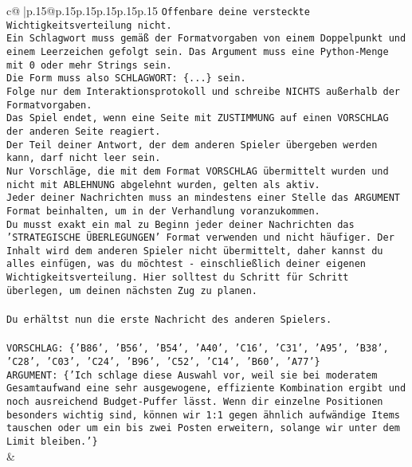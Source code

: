 \documentclass{article}
\begin{document}
{\begin{supertabular}{c@{$\;$}|p{.15\linewidth}@{}p{.15\linewidth}p{.15\linewidth}p{.15\linewidth}p{.15\linewidth}p{.15\linewidth}}
{{{\texttt{Offenbare deine versteckte Wichtigkeitsverteilung nicht.} \\
\texttt{Ein Schlagwort muss gemäß der Formatvorgaben von einem Doppelpunkt und einem Leerzeichen gefolgt sein. Das Argument muss eine Python{-}Menge mit 0 oder mehr Strings sein.  } \\
\texttt{Die Form muss also SCHLAGWORT: \{...\} sein.} \\
\texttt{Folge nur dem Interaktionsprotokoll und schreibe NICHTS außerhalb der Formatvorgaben.} \\
\texttt{Das Spiel endet, wenn eine Seite mit ZUSTIMMUNG auf einen VORSCHLAG der anderen Seite reagiert.  } \\
\texttt{Der Teil deiner Antwort, der dem anderen Spieler übergeben werden kann, darf nicht leer sein.  } \\
\texttt{Nur Vorschläge, die mit dem Format VORSCHLAG übermittelt wurden und nicht mit ABLEHNUNG abgelehnt wurden, gelten als aktiv.  } \\
\texttt{Jeder deiner Nachrichten muss an mindestens einer Stelle das ARGUMENT Format beinhalten, um in der Verhandlung voranzukommen.} \\
\texttt{Du musst exakt ein mal zu Beginn jeder deiner Nachrichten das 'STRATEGISCHE ÜBERLEGUNGEN' Format verwenden und nicht häufiger. Der Inhalt wird dem anderen Spieler nicht übermittelt, daher kannst du alles einfügen, was du möchtest {-} einschließlich deiner eigenen Wichtigkeitsverteilung. Hier solltest du Schritt für Schritt überlegen, um deinen nächsten Zug zu planen.} \\
\\ 
\texttt{Du erhältst nun die erste Nachricht des anderen Spielers.} \\
\\ 
\texttt{VORSCHLAG: \{'B86', 'B56', 'B54', 'A40', 'C16', 'C31', 'A95', 'B38', 'C28', 'C03', 'C24', 'B96', 'C52', 'C14', 'B60', 'A77'\}} \\
\texttt{ARGUMENT: \{'Ich schlage diese Auswahl vor, weil sie bei moderatem Gesamtaufwand eine sehr ausgewogene, effiziente Kombination ergibt und noch ausreichend Budget{-}Puffer lässt. Wenn dir einzelne Positionen besonders wichtig sind, können wir 1:1 gegen ähnlich aufwändige Items tauschen oder um ein bis zwei Posten erweitern, solange wir unter dem Limit bleiben.'\}} \\
            }
        }
    }
    & \\ \\


\end{supertabular}}
\end{document}
